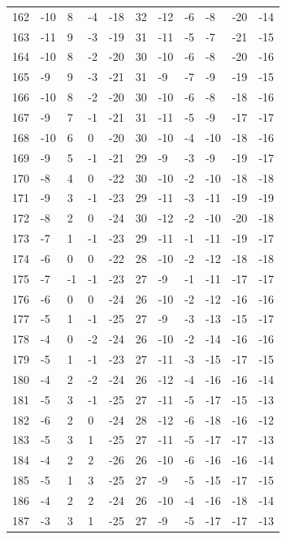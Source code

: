 \begin{table}[H]
\begin{tabular}{lllllllllll}
162 & -10 & 8 & -4 & -18 & 32 & -12 & -6 & -8 & -20 & -14 \\
163 & -11 & 9 & -3 & -19 & 31 & -11 & -5 & -7 & -21 & -15 \\
164 & -10 & 8 & -2 & -20 & 30 & -10 & -6 & -8 & -20 & -16 \\
165 & -9 & 9 & -3 & -21 & 31 & -9 & -7 & -9 & -19 & -15 \\
166 & -10 & 8 & -2 & -20 & 30 & -10 & -6 & -8 & -18 & -16 \\
167 & -9 & 7 & -1 & -21 & 31 & -11 & -5 & -9 & -17 & -17 \\
168 & -10 & 6 & 0 & -20 & 30 & -10 & -4 & -10 & -18 & -16 \\
169 & -9 & 5 & -1 & -21 & 29 & -9 & -3 & -9 & -19 & -17 \\
170 & -8 & 4 & 0 & -22 & 30 & -10 & -2 & -10 & -18 & -18 \\
171 & -9 & 3 & -1 & -23 & 29 & -11 & -3 & -11 & -19 & -19 \\
172 & -8 & 2 & 0 & -24 & 30 & -12 & -2 & -10 & -20 & -18 \\
173 & -7 & 1 & -1 & -23 & 29 & -11 & -1 & -11 & -19 & -17 \\
174 & -6 & 0 & 0 & -22 & 28 & -10 & -2 & -12 & -18 & -18 \\
175 & -7 & -1 & -1 & -23 & 27 & -9 & -1 & -11 & -17 & -17 \\
176 & -6 & 0 & 0 & -24 & 26 & -10 & -2 & -12 & -16 & -16 \\
177 & -5 & 1 & -1 & -25 & 27 & -9 & -3 & -13 & -15 & -17 \\
178 & -4 & 0 & -2 & -24 & 26 & -10 & -2 & -14 & -16 & -16 \\
179 & -5 & 1 & -1 & -23 & 27 & -11 & -3 & -15 & -17 & -15 \\
180 & -4 & 2 & -2 & -24 & 26 & -12 & -4 & -16 & -16 & -14 \\
181 & -5 & 3 & -1 & -25 & 27 & -11 & -5 & -17 & -15 & -13 \\
182 & -6 & 2 & 0 & -24 & 28 & -12 & -6 & -18 & -16 & -12 \\
183 & -5 & 3 & 1 & -25 & 27 & -11 & -5 & -17 & -17 & -13 \\
184 & -4 & 2 & 2 & -26 & 26 & -10 & -6 & -16 & -16 & -14 \\
185 & -5 & 1 & 3 & -25 & 27 & -9 & -5 & -15 & -17 & -15 \\
186 & -4 & 2 & 2 & -24 & 26 & -10 & -4 & -16 & -18 & -14 \\
187 & -3 & 3 & 1 & -25 & 27 & -9 & -5 & -17 & -17 & -13 \\

\end{tabular}
\end{table}
